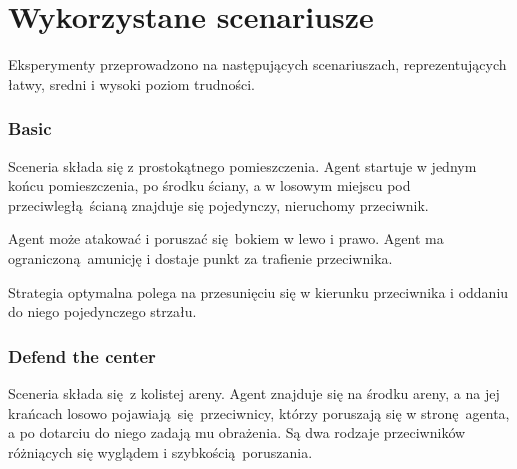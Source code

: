 \section{Wykorzystane scenariusze}
Eksperymenty przeprowadzono na następujących scenariuszach, reprezentujących łatwy, sredni i wysoki poziom trudności.

\subsubsection{Basic}\label{scenario_basic}
Sceneria składa się z prostokątnego pomieszczenia. Agent startuje w jednym końcu pomieszczenia, po środku ściany, a w losowym miejscu pod przeciwległą ścianą znajduje się pojedynczy, nieruchomy przeciwnik.

Agent może atakować i poruszać się bokiem w lewo i prawo. Agent ma ograniczoną amunicję i dostaje punkt za trafienie przeciwnika.

Strategia optymalna polega na przesunięciu się w kierunku przeciwnika i oddaniu do niego pojedynczego strzału.


\begin{figure}[H]
	\begin{floatrow}
	\end{floatrow}
\end{figure}

\subsubsection{Defend the center}\label{scenario_dtc}
Sceneria składa się z kolistej areny. Agent znajduje się na środku areny, a na jej krańcach losowo pojawiają się przeciwnicy, którzy poruszają się w stronę agenta, a po dotarciu do niego zadają mu obrażenia. Są dwa rodzaje przeciwników różniących się wyglądem i szybkością poruszania.

